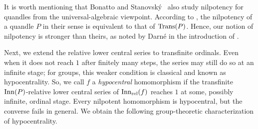 It is worth mentioning that Bonatto and Stanovsk\'{y}~\cite{bonatto_stanovsky_2021_commutator_theory_for_racks_and_quandles} also study nilpotency for quandles from the universal-algebraic viewpoint. According to \cite[Theorem 1.2]{bonatto_stanovsky_2021_commutator_theory_for_racks_and_quandles}, the nilpotency of a quandle $P$ in their sense is equivalent to that of $\operatorname{Trans}(P)$. Hence, our notion of nilpotency is stronger than theirs, as noted by Darn\'{e} in the introduction of \cite{darne_2026_nilpotent_quandles}.





Next, we extend the relative lower central series to transfinite ordinals.
Even when it does not reach $1$ after finitely many steps, the series may still do so at an infinite stage; for groups, this weaker condition is classical and known as hypocentrality.
So, we call $f$ a \emph{hypocentral} homomorphism if the transfinite $\operatorname{Inn}(P)$-relative lower central series of $\operatorname{Inn_{rel}}(f)$ reaches $1$ at some, possibly infinite, ordinal stage. Every nilpotent homomorphism is hypocentral, but the converse fails in general.
We obtain the following group-theoretic characterization of hypocentrality.




